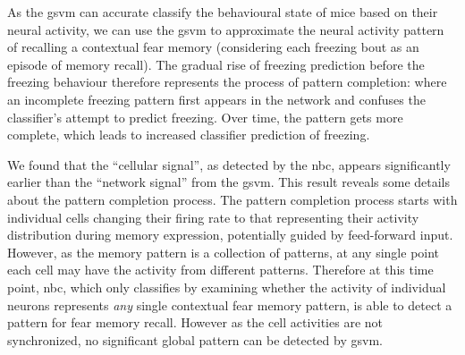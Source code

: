 As the \gls{gsvm} can accurate classify the behavioural state of mice based on their neural activity, we can use the \gls{gsvm} to approximate the neural activity pattern of recalling a contextual fear memory (considering each freezing bout as an episode of memory recall). The gradual rise of freezing prediction before the freezing behaviour therefore represents the process of pattern completion: where an incomplete freezing pattern first appears in the network and confuses the classifier's attempt to predict freezing. Over time, the pattern gets more complete, which leads to increased classifier prediction of freezing. 

\begin{comment}
It is worth noting that while computational studies often model pattern completion using a stationary pattern \citep{rolls13}, our data suggest that the neural correlate of the contextual fear memory recall cannot be explained by a stationary attractor state. In a stationary attractor state, 

The prediction accuracy of the \gls{nbc} and \gls{gsvm}

the difference in prediction accuracy between \gls{nbc} and \gls{gsvm}, as well as the different temporal dynamics of the prediction precedence suggest that the neural correlates of a contextual fear memory recall is not a stationary state, since otherwise the performance of \gls{nbc} and \gls{gsvm} should be very similar, and have similar temporal dynamics in pattern completion. \todo{This is a pretty long sentence!  You should try and break it up} Therefore, our result suggests that even in an apparently ``simple'' memory such as the contextual fear memory, the neural correlates are dynamic: the state of neural activity during memory recall can move between multiple states.
\end{comment}

We found that the ``cellular signal'', as detected by the \gls{nbc}, appears significantly earlier than the ``network signal'' from the \gls{gsvm}. This result reveals some details about the pattern completion process. The pattern completion process starts with individual cells changing their firing rate to that representing their activity distribution during memory expression, potentially guided by feed-forward input. However, as the memory pattern is a collection of patterns, at any single point each cell may have the activity from different patterns. Therefore at this time point, \gls{nbc}, which only classifies by examining whether the activity of individual neurons represents \textit{any} single contextual fear memory pattern, is able to detect a pattern for fear memory recall. However as the cell activities are not synchronized, no significant global pattern can be detected by \gls{gsvm}. 

